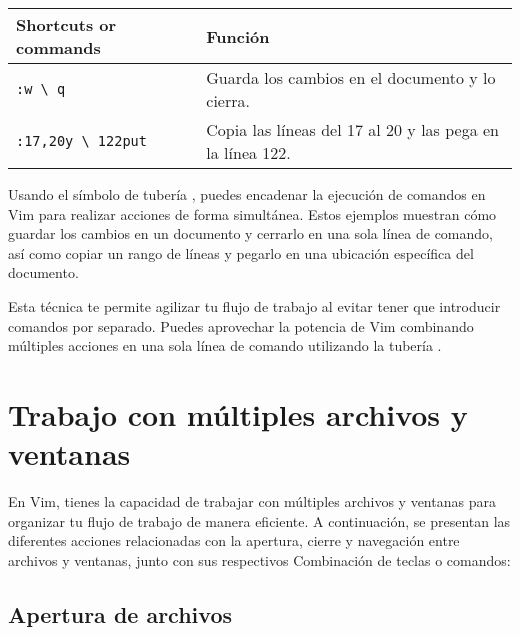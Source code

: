\documentclass[
  doc,
  floatsintext,
  longtable,
  a4paper,
  nolmodern,
  notxfonts,
  notimes,
  colorlinks=true,linkcolor=blue,citecolor=blue,urlcolor=blue]{apa7}
\begin{document}
\begin{longtable}[]{@{}
  >{\raggedright\arraybackslash}p{}
  >{\raggedright\arraybackslash}p{}@{}}
\toprule\noalign{}
\begin{minipage}[b]{\linewidth}\raggedright
Shortcuts or commands
\end{minipage} & \begin{minipage}[b]{\linewidth}\raggedright
Función
\end{minipage} \\
\midrule\noalign{}
\endhead
\bottomrule\noalign{}
\endlastfoot
\texttt{:w\ \textbackslash{}\textbar{}\ q} & Guarda los cambios en el
documento y lo cierra. \\
\texttt{:17,20y\ \textbackslash{}\textbar{}\ 122put} & Copia las líneas
del 17 al 20 y las pega en la línea 122. \\
\end{longtable}

Usando el símbolo de tubería \texttt{\textbar{}}, puedes encadenar la
ejecución de comandos en Vim para realizar acciones de forma simultánea.
Estos ejemplos muestran cómo guardar los cambios en un documento y
cerrarlo en una sola línea de comando, así como copiar un rango de
líneas y pegarlo en una ubicación específica del documento.

Esta técnica te permite agilizar tu flujo de trabajo al evitar tener que
introducir comandos por separado. Puedes aprovechar la potencia de Vim
combinando múltiples acciones en una sola línea de comando utilizando la
tubería \texttt{\textbar{}}.

\section{Trabajo con múltiples archivos y
ventanas}\label{trabajo-con-muxfaltiples-archivos-y-ventanas}

En Vim, tienes la capacidad de trabajar con múltiples archivos y
ventanas para organizar tu flujo de trabajo de manera eficiente. A
continuación, se presentan las diferentes acciones relacionadas con la
apertura, cierre y navegación entre archivos y ventanas, junto con sus
respectivos Combinación de teclas o comandos:

\subsection{Apertura de archivos}\label{apertura-de-archivos}
\end{document}
